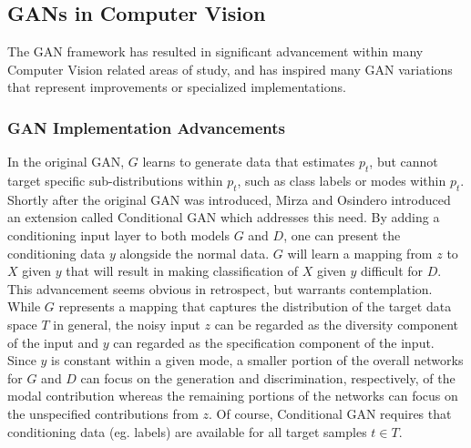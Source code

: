 \documentclass[11pt]{article}
\begin{document}
\subsection{GANs in Computer Vision}

The GAN framework has resulted in significant advancement within many Computer Vision related areas of study, and has inspired many GAN variations that represent improvements or specialized implementations.

\subsubsection{GAN Implementation Advancements}

In the original GAN, $G$ learns to generate data that estimates $p_t$, but cannot target specific sub-distributions within $p_t$, such as class labels or modes within $p_t$.  Shortly after the original GAN was introduced, Mirza and Osindero introduced an extension called Conditional GAN \cite{mirza2014conditional} which addresses this need.  By adding a conditioning input layer to both models $G$ and $D$, one can present the conditioning data $y$ alongside the normal data.  $G$ will learn a mapping from $z$ to $X$ given $y$ that will result in making classification of $X$ given $y$ difficult for $D$.  This advancement seems obvious in retrospect, but warrants contemplation.  While $G$ represents a mapping that captures the distribution of the target data space $T$ in general, the noisy input $z$ can be regarded as the diversity component of the input and $y$ can regarded as the specification component of the input.  Since $y$ is constant within a given mode, a smaller portion of the overall networks for $G$ and $D$ can focus on the generation and discrimination, respectively, of the modal contribution whereas the remaining portions of the networks can focus on the unspecified contributions from $z$.  Of course, Conditional GAN requires that conditioning data (eg. labels) are available for all target samples $t \in T$.
\end{document}
